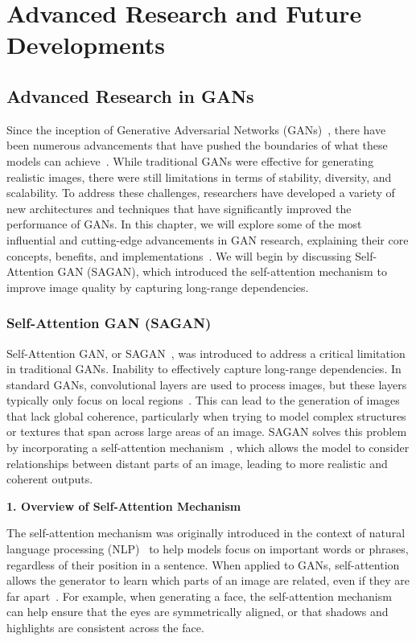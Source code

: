 \part{Advanced Research and Future Developments}

\chapter{Advanced Research in GANs}

Since the inception of Generative Adversarial Networks (GANs)~\cite{goodfellow2014generative}, there have been numerous advancements that have pushed the boundaries of what these models can achieve~\cite{de2021survey}. While traditional GANs were effective for generating realistic images, there were still limitations in terms of stability, diversity, and scalability. To address these challenges, researchers have developed a variety of new architectures and techniques that have significantly improved the performance of GANs. In this chapter, we will explore some of the most influential and cutting-edge advancements in GAN research, explaining their core concepts, benefits, and implementations~\cite{li2024survey}. We will begin by discussing Self-Attention GAN (SAGAN), which introduced the self-attention mechanism to improve image quality by capturing long-range dependencies.

\section{Self-Attention GAN (SAGAN)}

Self-Attention GAN, or SAGAN~\cite{zhang2019self}, was introduced to address a critical limitation in traditional GANs. Inability to effectively capture long-range dependencies. In standard GANs, convolutional layers are used to process images, but these layers typically only focus on local regions~\cite{zhang2019self}. This can lead to the generation of images that lack global coherence, particularly when trying to model complex structures or textures that span across large areas of an image. SAGAN solves this problem by incorporating a self-attention mechanism~\cite{vaswani2017attention}, which allows the model to consider relationships between distant parts of an image, leading to more realistic and coherent outputs.

\textbf{1. Overview of Self-Attention Mechanism}

The self-attention mechanism was originally introduced in the context of natural language processing (NLP)~\cite{li2024survey} to help models focus on important words or phrases, regardless of their position in a sentence. When applied to GANs, self-attention allows the generator to learn which parts of an image are related, even if they are far apart~\cite{xu2017attngan}. For example, when generating a face, the self-attention mechanism can help ensure that the eyes are symmetrically aligned, or that shadows and highlights are consistent across the face.

